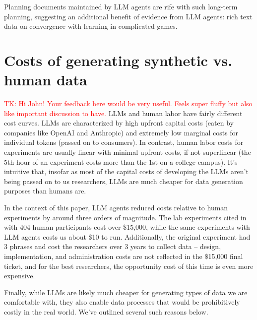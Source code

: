 \documentclass{article} %
\newcommand{\TK}[1]{\textcolor{red}{TK: #1}}
\begin{document}
Planning documents maintained by LLM agents are rife with such long-term planning, suggesting an additional benefit of evidence from LLM agents: rich text data on convergence with learning in complicated games.


\section{Costs of generating synthetic vs. human data}
\TK{Hi John! Your feedback here would be very useful. 
Feels super fluffy but also like important discussion to have.}
LLMs and human labor have fairly different cost curves. 
LLMs are characterized by high upfront capital costs (eaten by companies like OpenAI and Anthropic) and extremely low marginal costs for individual tokens (passed on to consumers). 
In contrast, human labor costs for experiments are usually linear with minimal upfront costs, if not superlinear (the 5th hour of an experiment costs more than the 1st on a college campus). 
It's intuitive that, insofar as most of the capital costs of developing the LLMs aren't being passed on to us researchers, LLMs are much cheaper for data generation purposes than humans are.

In the context of this paper, LLM agents reduced costs relative to human experiments by around three orders of magnitude. 
The lab experiments cited in \cite{li2017obviously} with 404 human participants cost over \$15,000, while the same experiments with LLM agents costs us about \$10 to run. 
Additionally, the original experiment had 3 phrases and cost the researchers over 3 years to collect data -- design, implementation, and administration costs are not reflected in the \$15,000 final ticket, and for the best researchers, the opportunity cost of this time is even more expensive.

Finally, while LLMs are likely much cheaper for generating types of data we are comfortable with, they also enable data processes that would be prohibitively costly in the real world. 
We've outlined several such reasons below.
\end{document}
